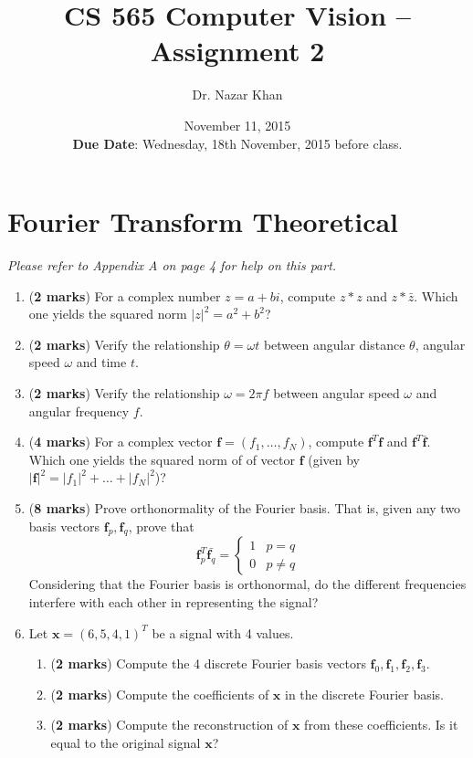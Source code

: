 \documentclass[11pt]{article} %
\title{CS 565 Computer Vision -- Assignment 2} %
\author{Dr. Nazar Khan}
\date{November 11, 2015\\\textbf{Due Date}: Wednesday, 18th November, 2015 before class.} %
\newcommand\answer[1]{}
\begin{document}
\maketitle

\section*{Fourier Transform Theoretical}
\emph{Please refer to Appendix A on page 4 for help on this part.}
\begin{enumerate}
\item (\textbf{2 marks}) For a complex number $z=a+bi$, compute $z*z$ and $z*\bar{z}$. Which one yields the squared norm $|z|^2=a^2+b^2$?
\answer{}

\item (\textbf{2 marks}) Verify the relationship $\theta=\omega t$ between angular distance $\theta$, angular speed $\omega$ and time $t$.
\answer{}

\item (\textbf{2 marks}) Verify the relationship $\omega=2\pi f$ between angular speed $\omega$ and angular frequency $f$.
\answer{}

\item (\textbf{4 marks}) For a complex vector $\mathbf{f}=(f_1,\dots,f_N)$, compute $\mathbf{f}^T\mathbf{f}$ and $\mathbf{f}^T\bar{\mathbf{f}}$. Which one yields the squared norm of of vector $\mathbf{f}$ (given by $|\mathbf{f}|^2=|f_1|^2+\dots+|f_N|^2$)?
\answer{}

\item (\textbf{8 marks}) Prove orthonormality of the Fourier basis. That is, given any two basis vectors $\mathbf{f}_p,\mathbf{f}_q$, prove that 
\begin{equation}
\mathbf{f}_p^T\bar{\mathbf{f}_q}=\begin{cases}1&p=q\\0&p\neq q\end{cases}
\end{equation}
Considering that the Fourier basis is orthonormal, do the different frequencies interfere with each other in representing the signal?
\answer{}

\item Let $\mathbf{x}=(6,5,4,1)^T$ be a signal with 4 values.
\begin{enumerate}
\item (\textbf{2 marks}) Compute the 4 discrete Fourier basis vectors $\mathbf{f}_0,\mathbf{f}_1,\mathbf{f}_2,\mathbf{f}_3$.
\answer{}
\item (\textbf{2 marks}) Compute the coefficients of $\mathbf{x}$ in the discrete Fourier basis.
\answer{}
\item (\textbf{2 marks}) Compute the reconstruction of $\mathbf{x}$ from these coefficients. Is it equal to the original signal $\mathbf{x}$?
\answer{}

\end{enumerate}
\end{enumerate}
\end{document}
